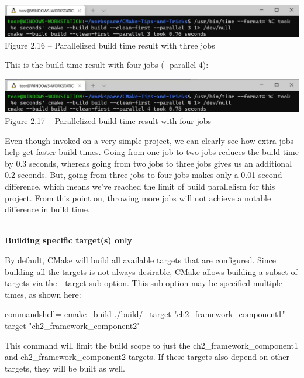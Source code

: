 \begin{center}
\includegraphics[width=1.\textwidth]{content/1/chapter2/images/16.jpg}\\
Figure 2.16 – Parallelized build time result with three jobs
\end{center}

This is the build time result with four jobs (-{}-parallel 4):

\begin{center}
\includegraphics[width=1.\textwidth]{content/1/chapter2/images/17.jpg}\\
Figure 2.17 – Parallelized build time result with four jobs
\end{center}

Even though invoked on a very simple project, we can clearly see how extra jobs help get faster build times. Going from one job to two jobs reduces the build time by 0.3 seconds, whereas going from two jobs to three jobs gives us an additional 0.2 seconds. But, going from three jobs to four jobs makes only a 0.01-second difference, which means we've reached the limit of build parallelism for this project. From this point on, throwing more jobs will not achieve a notable difference in build time.

\hspace*{\fill} \\ %
\noindent
\textbf{Building specific target(s) only}

By default, CMake will build all available targets that are configured. Since building all the targets is not always desirable, CMake allows building a subset of targets via the -{}-target sub-option. This sub-option may be specified multiple times, as shown here:

\begin{tcblisting}{commandshell={}}
cmake --build ./build/ --target "ch2_framework_component1"
--target "ch2_framework_component2"
\end{tcblisting}

This command will limit the build scope to just the ch2\_framework\_component1 and ch2\_framework\_component2 targets. If these targets also depend on other targets, they will be built as well.

